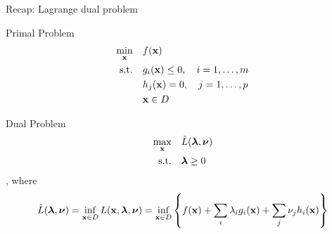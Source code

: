 \documentclass[12pt,notes,mathserif]{beamer}
\begin{document}
\begin{frame}
	{Recap: Lagrange dual problem}
	\begin{block}{Primal Problem}
		\vspace{-1em}
		\begin{equation}
			\begin{aligned}
				\min_{\mathbf{x}}   \quad    & f(\mathbf{x})         \\
				\textrm{s.t.} \quad & g_i(\mathbf{x}) \le 0,\quad i=1,\dots,m \\
									& h_j(\mathbf{x}) =0 ,\quad j=1,\dots, p   \\
									& \mathbf{x} \in D \\ 
			\end{aligned}
		\end{equation}
	\end{block}
	\begin{block}{Dual Problem}
		\vspace{-1em}
		\begin{equation}
			\begin{aligned}
				\max_{\mathbf{x}}   \quad      & \tilde{L}( \boldsymbol{\lambda}, \boldsymbol{\nu}) \\
				\textrm{s.t.} \quad & \boldsymbol{\lambda} \ge 0             \\
			\end{aligned}
		\end{equation}
		, where
		\vspace{-1em}
		\begin{equation*}
			\tilde{L}(\boldsymbol{\lambda}, \boldsymbol{\nu} ) =  \inf_{\mathbf{x} \in D} L(\mathbf{x}, \boldsymbol{\lambda}, \boldsymbol{\nu})
			= \inf_{\mathbf{x} \in D} \left\{ f(\mathbf{x})+  \sum_i \lambda_i g_i(\mathbf{x}) + \sum_j \nu_j h_i(\mathbf{x}) \right\}
		\end{equation*}
	\end{block}
\end{frame}
\end{document}
